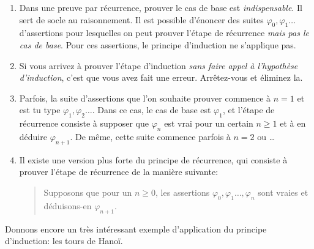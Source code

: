 \documentclass[french,course,oneside,theoremnosection]{lecture}
\begin{document}
\begin{remark}
\begin{enumerate}
\item Dans une preuve par récurrence, prouver le cas de base est \emph{indispensable}. Il sert de socle au raisonnement. Il est possible d'énoncer des suites $\varphi_0, \varphi_1\ldots$ d'assertions pour lesquelles on peut prouver l'étape de récurrence \emph{mais pas le cas de base}. Pour ces assertions, le principe d'induction ne s'applique pas.
\item Si vous arrivez à prouver l'étape d'induction \emph{sans faire appel à l'hypothèse d'induction}, c'est que vous avez fait une erreur. Arrêtez-vous et éliminez la.
\item Parfois, la suite d'assertions que l'on souhaite prouver commence à $n=1$ et est tu type $\varphi_1, \varphi_2\ldots$. Dans ce cas, le cas de base est $\varphi_1$, et l'étape de récurrence consiste à supposer que $\varphi_n$ est vrai pour un certain $n\geq 1$ et à en déduire $\varphi_{n+1}$. De même, cette suite commence parfois à $n=2$ ou \ldots
\item Il existe une version plus forte du principe de récurrence, qui consiste à prouver l'étape de récurrence de la manière suivante:
\begin{quotation}
 Supposons que pour un $n\geq 0$, les assertions $\varphi_0, \varphi_1 \ldots,  \varphi_n$ sont vraies et déduisons-en $\varphi_{n+1}$.
\end{quotation}
 
\end{enumerate}
\end{remark}

Donnons encore un très intéressant exemple d'application du principe d'induction: les tours de Hanoï.
\end{document}
